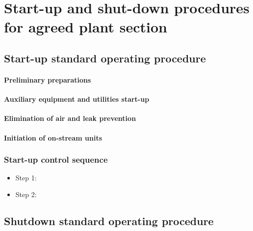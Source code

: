 \section{Start-up and shut-down procedures for agreed plant section}

\subsection{Start-up standard operating procedure}

\paragraph{Preliminary preparations}

\paragraph{Auxiliary equipment and utilities start-up}

\paragraph{Elimination of air and leak prevention}

\paragraph{Initiation of on-stream units}



\subsubsection{Start-up control sequence}


\begin{itemize}
    \item Step 1:
    \item Step 2: 
\end{itemize}


\subsection{Shutdown standard operating procedure}